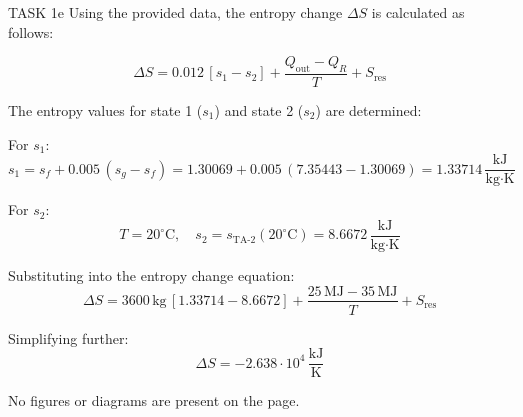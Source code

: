 TASK 1e  
Using the provided data, the entropy change \( \Delta S \) is calculated as follows:  

\[
\Delta S = 0.012 \, [s_1 - s_2] + \frac{Q_{\text{out}} - Q_R}{T} + S_{\text{res}}
\]

The entropy values for state 1 (\( s_1 \)) and state 2 (\( s_2 \)) are determined:  

For \( s_1 \):  
\[
s_1 = s_f + 0.005 \, (s_g - s_f) = 1.30069 + 0.005 \, (7.35443 - 1.30069) = 1.33714 \, \frac{\text{kJ}}{\text{kg·K}}
\]

For \( s_2 \):  
\[
T = 20^\circ\text{C}, \quad s_2 = s_{\text{TA-2}}(20^\circ\text{C}) = 8.6672 \, \frac{\text{kJ}}{\text{kg·K}}
\]

Substituting into the entropy change equation:  
\[
\Delta S = 3600 \, \text{kg} \, \left[ 1.33714 - 8.6672 \right] + \frac{25 \, \text{MJ} - 35 \, \text{MJ}}{T} + S_{\text{res}}
\]

Simplifying further:  
\[
\Delta S = -2.638 \cdot 10^4 \, \frac{\text{kJ}}{\text{K}}
\]  

No figures or diagrams are present on the page.